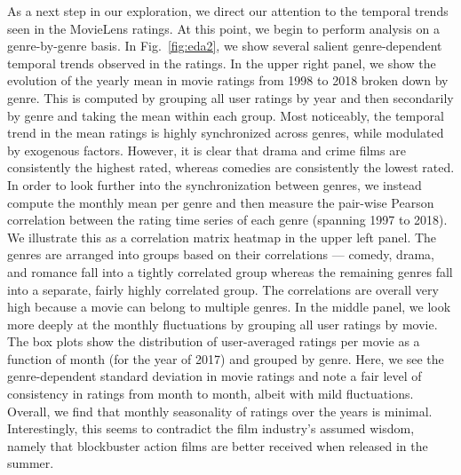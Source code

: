 \documentclass[dvipsnames]{article}
\begin{document}
As a next step in our exploration, we direct our attention to the temporal trends seen in the MovieLens ratings. At this point, we begin to perform analysis on a genre-by-genre basis. In Fig.~\ref{fig:eda2}, we show several salient genre-dependent temporal trends observed in the ratings. In the upper right panel, we show the evolution of the yearly mean in movie ratings from 1998 to 2018 broken down by genre. This is computed by grouping all user ratings by year and then secondarily by genre and taking the mean within each group. Most noticeably, the temporal trend in the mean ratings is highly synchronized across genres, while modulated by exogenous factors. However, it is clear that drama and crime films are consistently the highest rated, whereas comedies are consistently the lowest rated. In order to look further into the synchronization between genres, we instead compute the monthly mean per genre and then measure the pair-wise Pearson correlation between the rating time series of each genre (spanning 1997 to 2018). We illustrate this as a correlation matrix heatmap in the upper left panel. The genres are arranged into groups based on their correlations --- comedy, drama, and romance fall into a tightly correlated group whereas the remaining genres fall into a separate, fairly highly correlated group. The correlations are overall very high because a movie can belong to multiple genres. In the middle panel, we look more deeply at the monthly fluctuations by grouping all user ratings by movie. The box plots show the distribution of user-averaged ratings per movie as a function of month (for the year of 2017) and grouped by genre. Here, we see the genre-dependent standard deviation in movie ratings and note a fair level of consistency in ratings from month to month, albeit with mild fluctuations. Overall, we find that monthly seasonality of ratings over the years is minimal. Interestingly, this seems to contradict the film industry's assumed wisdom, namely that blockbuster action films are better received when released in the summer.
\end{document}
